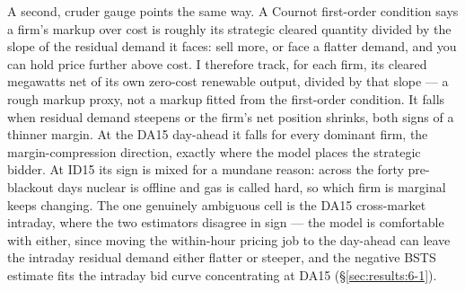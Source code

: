 \documentclass[11pt,a4paper]{article}
\theoremstyle{definition}
\theoremstyle{remark}
\theoremstyle{plain}
\begin{document}
A second, cruder gauge points the same way. A Cournot first-order condition says a firm's markup over cost is roughly its strategic cleared quantity divided by the slope of the residual demand it faces: sell more, or face a flatter demand, and you can hold price further above cost. I therefore track, for each firm, its cleared megawatts net of its own zero-cost renewable output, divided by that slope --- a rough markup proxy, not a markup fitted from the first-order condition. It falls when residual demand steepens or the firm's net position shrinks, both signs of a thinner margin. At the DA15 day-ahead it falls for every dominant firm, the margin-compression direction, exactly where the model places the strategic bidder. At ID15 its sign is mixed for a mundane reason: across the forty pre-blackout days nuclear is offline and gas is called hard, so which firm is marginal keeps changing. The one genuinely ambiguous cell is the DA15 cross-market intraday, where the two estimators disagree in sign --- the model is comfortable with either, since moving the within-hour pricing job to the day-ahead can leave the intraday residual demand either flatter or steeper, and the negative BSTS estimate fits the intraday bid curve concentrating at DA15 (\S\ref{sec:results:6-1}).
\end{document}
